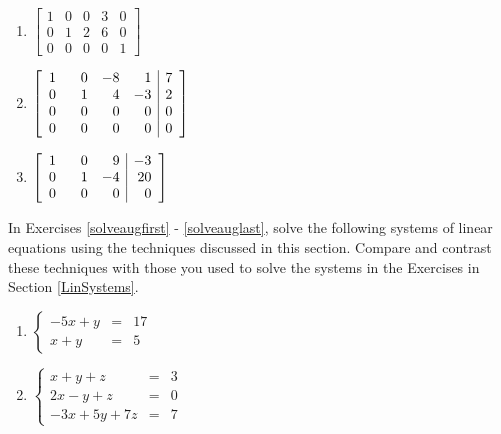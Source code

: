 \documentclass{ximera}
\begin{document}
\begin{multicols}{3}
\begin{enumerate}
\setcounter{enumi}{\value{HW}}

\item $\left[ \begin{array}{rrrr|r} 
1 & 0 & 0 & 3 & 0 \\ 
0 & 1 & 2 & 6 & 0 \\ 
0 & 0 & 0 & 0 & 1 
\end{array} \right]$

\item $\left[ \begin{array}{rrrr|r} 
1 & \hphantom{-}0 & -8 & 1 & 7 \\ 
0 & 1 & 4 & -3 & 2 \\ 
0 & 0 & 0 & 0 & 0 \\
0 & 0 & 0 & 0 & 0 
\end{array} \right]$

\item $\left[ \begin{array}{rrr|r} 
1 & \hphantom{-}0 & 9 & -3 \\ 
0 & 1 & -4 & 20 \\ 
0 & 0 & 0 & 0  
\end{array} \right]$ \label{decodelast}

\setcounter{HW}{\value{enumi}}
\end{enumerate}
\end{multicols}




In Exercises \ref{solveaugfirst} - \ref{solveauglast}, solve the following systems of linear equations using the techniques discussed in this section.  Compare and contrast these techniques with those you used to solve the systems in the Exercises in Section \ref{LinSystems}.

\begin{multicols}{2}
\begin{enumerate}
\setcounter{enumi}{\value{HW}}


\item $\left\{ \begin{array}{rcr} -5x + y & = & 17  \\ x + y & = & 5  \end{array} \right.$ \label{solveaugfirst}
\item $\left\{ \begin{array}{rcr} x + y + z & = & 3 \\ 2x - y + z & = & 0 \\ -3x + 5y + 7z & = & 7  \end{array} \right.$

\setcounter{HW}{\value{enumi}}
\end{enumerate}
\end{multicols}
\end{document}
